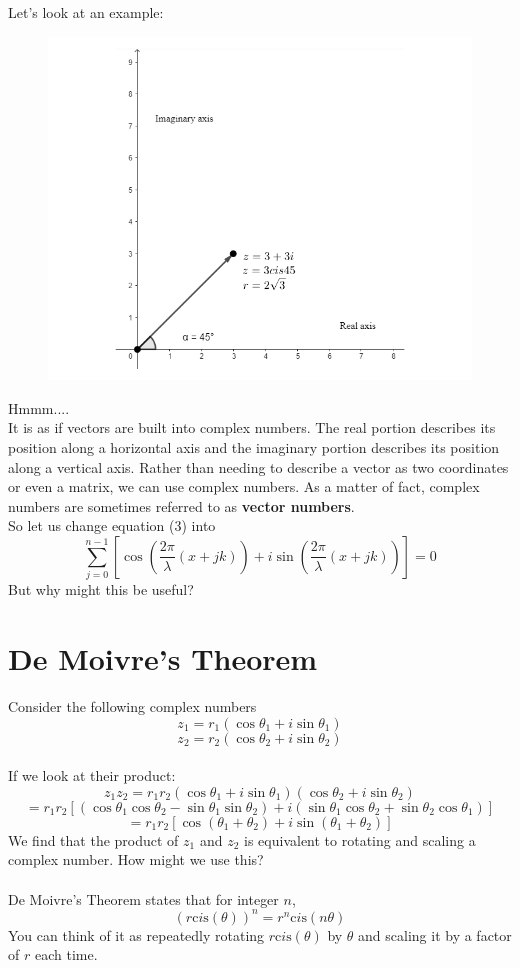 \documentclass[12pt]{article}
\begin{document}
\newpage
Let's look at an example:
\begin{figure}[h!]
  \includegraphics[width=\linewidth]{complexdiagram.png}
  
\end{figure}

Hmmm....
\\It is as if vectors are built into complex numbers. The real portion describes its position along a horizontal axis and the imaginary portion describes its position along a vertical axis.
Rather than needing to describe a vector as two coordinates or even a matrix, we can use complex numbers. As a matter of fact, complex numbers are sometimes referred to as \textbf{vector numbers}.
\\So let us change equation (3) into
\begin{equation}
  \label{eqn:4}
  \sum_{j=0}^{n-1}[\cos(\frac{2\pi}{\lambda}(x+jk)) + i\sin(\frac{2\pi}{\lambda}(x+jk))] = 0
  \end{equation}
But why might this be useful? 
\section{De Moivre's Theorem}
Consider the following complex numbers $$z_{1}=r_{1}(\cos\theta_{1}+i\sin\theta_{1})$$
$$z_{2}=r_{2}(\cos\theta_{2}+i\sin\theta_{2})$$
\\If we look at their product:
$$z_{1}z_{2}=r_{1}r_{2}(\cos\theta_{1}+i\sin\theta_{1})(\cos\theta_{2}+i\sin\theta_{2})$$
$$=r_{1}r_{2}[(\cos\theta_{1}\cos\theta_{2}-\sin\theta_{1}\sin\theta_{2})+i(\sin\theta_{1}\cos\theta_{2}+\sin\theta_{2}\cos\theta_{1})]$$
$$=r_{1}r_{2}[\cos(\theta_{1}+\theta_{2})+i\sin(\theta_{1}+\theta_{2})]$$
We find that the product of $z_{1}$ and $z_{2}$ is equivalent to rotating and scaling a complex number. How might we use this?
\\
\\
De Moivre's Theorem states that for integer $n$,
$$(r\text{c}i\text{s}(\theta))^n = r^n\text{c}i\text{s}(n\theta)$$
You can think of it as repeatedly rotating $r\text{c}i\text{s}(\theta)$ by $\theta$ and scaling it by a factor of $r$ each time.
\newpage
\end{document}
